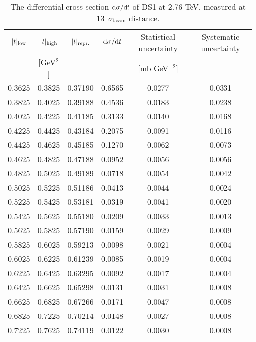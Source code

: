 \documentclass[TOTEM]{cernphprep}
\begin{document}
    \begin{table*}\small\color{black}
        \begin{center}
            \caption{The differential cross-section ${\rm d}\sigma/{\rm d}t$ of DS1 at 2.76 TeV, measured at 13~$\sigma_{\rm beam}$ distance.}
            \begin{tabular}{ | c  c  c | c  c  c|}
		\hline
			$|t|_{\rm low}$		& $|t|_{\rm high}$		&	$|t|_{\rm repr.}$		&	${\rm d}\sigma/{\rm d}t$	& Statistical uncertainty 	&	Systematic uncertainty \\ 
						& [GeV$^{2}$]			&					&					&	[mb GeV$^{-2}$]		& 				\\ \hline 
	0.3625	&	0.3825	&	0.37190	&	0.6565	&	0.0277	&	0.0331\\
	0.3825	&	0.4025	&	0.39188	&	0.4536	&	0.0183	&	0.0238\\
	0.4025	&	0.4225	&	0.41185	&	0.3133	&	0.0140	&	0.0168\\
	0.4225	&	0.4425	&	0.43184	&	0.2075	&	0.0091	&	0.0116\\
	0.4425	&	0.4625	&	0.45185	&	0.1270	&	0.0062	&	0.0073\\
	0.4625	&	0.4825	&	0.47188	&	0.0952	&	0.0056	&	0.0056\\
	0.4825	&	0.5025	&	0.49189	&	0.0718	&	0.0054	&	0.0042\\
	0.5025	&	0.5225	&	0.51186	&	0.0413	&	0.0044	&	0.0024\\
	0.5225	&	0.5425	&	0.53181	&	0.0319	&	0.0041	&	0.0020\\
	0.5425	&	0.5625	&	0.55180	&	0.0209	&	0.0033	&	0.0013\\
	0.5625	&	0.5825	&	0.57190	&	0.0159	&	0.0029	&	0.0009\\
	0.5825	&	0.6025	&	0.59213	&	0.0098	&	0.0021	&	0.0004\\
	0.6025	&	0.6225	&	0.61239	&	0.0085	&	0.0019	&	0.0004\\
	0.6225	&	0.6425	&	0.63295	&	0.0092	&	0.0017	&	0.0004\\
	0.6425	&	0.6625	&	0.65298	&	0.0131	&	0.0031	&	0.0008\\
	0.6625	&	0.6825	&	0.67266	&	0.0171	&	0.0047	&	0.0008\\
	0.6825	&	0.7225	&	0.70214	&	0.0148	&	0.0027	&	0.0008\\
	0.7225	&	0.7625	&	0.74119	&	0.0122	&	0.0030	&	0.0008\\ \hline
            \end{tabular}
        \label{DS1_data}
        \end{center}
    \end{table*}
\end{document}
